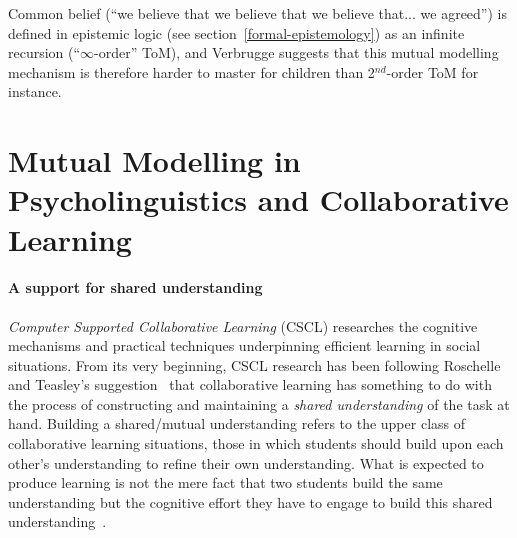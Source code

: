 \documentclass{sig-alternate}
\begin{document}
Common belief (``we believe that we believe that we believe that... we agreed'') is
defined in epistemic logic (see section~\ref{formal-epistemology}) as an infinite
recursion (``$\infty$-order'' ToM), and Verbrugge suggests that this mutual
modelling mechanism is therefore harder to master for children than 2$^{nd}$-order ToM for
instance.
%
%
%
%
%

\section{Mutual Modelling in Psycholinguistics and Collaborative Learning}

\paragraph{A support for shared understanding}

\emph{Computer Supported Collaborative Learning} (CSCL) researches the cognitive
mechanisms and practical techniques underpinning efficient learning in social
situations. From its very beginning, CSCL research has been following
Roschelle and Teasley's suggestion~\cite{roschelle1995construction} that
collaborative learning has something to do with the process of constructing and
maintaining a \emph{shared understanding} of the task at hand. Building a shared/mutual
understanding refers to the upper class of collaborative learning situations,
those in which students should build upon each other's understanding to refine
their own understanding.  What is expected to produce learning is not the mere
fact that two students build the same understanding but the cognitive effort
they have to engage to build this shared
understanding~\cite{schwartz1995emergence}.
\end{document}
